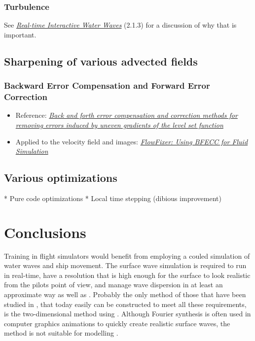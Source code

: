 \subsection{Turbulence}

See \textit{\href{http://publications.dice.se/attachments/water\%20interaction\%20ottosson_bjorn.pdf}{Real-time Interactive Water Waves}} (2.1.3) for a discussion of why that is important.

\section{Sharpening of various advected fields}

\subsection{Backward Error Compensation and Forward Error Correction}

\begin{itemize}
    \item Reference: \textit{\href{http://smartech.gatech.edu/xmlui/bitstream/handle/1853/29473/2002-389.pdf}{Back and forth error compensation and correction methods for removing errors induced by uneven gradients of the level set function}}
    \item Applied to the velocity field and images: \textit{\href{http://www.gvu.gatech.edu/~jarek/papers/FlowFixer.pdf}{FlowFixer: Using BFECC for Fluid Simulation}}
\end{itemize}

\section{Various optimizations}

* Pure code optimizations
* Local time stepping (dibious improvement)

\chapter{Conclusions}

Training in flight simulators would benefit from employing a couled simulation of water waves and ship movement. The surface wave simulation is required to run in real-time, have a resolution that is high enough for the surface to look realistic from the pilots point of view, and manage wave dispersion in at least an approximate way as well as \FSI. Probably the only method of those that have been studied in \thismasterthesiswork, that today easily can be constructed to meet all these requirements, is the two-dimensional method using \LPD. Although Fourier synthesis is often used in computer graphics animations to quickly create realistic surface waves, the method is not suitable for modelling \FSI.

